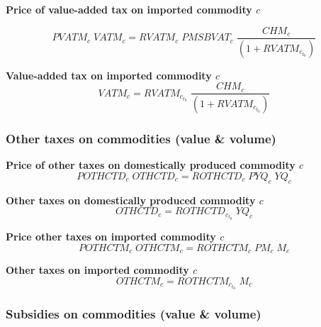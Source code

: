 \documentclass[12pt]{article}
\numberwithin{equation}{section}
\begin{document}
\noindent \textbf{Price of value-added tax on imported commodity $c$} 

\begin{dmath}
PVATM_{c} \; VATM_{c} = RVATM_{c} \; PMSBVAT_{c} \; \frac{CHM_{c}}{\left( 1 + RVATM_{c}_{t_0} \right)}
\label{Exception_taxes_prices.mdlPVATM[c]}
\end{dmath}

\noindent \textbf{Value-added tax on imported commodity $c$} 
\begin{dmath}
VATM_{c} = RVATM_{c}_{t_0} \; \frac{CHM_{c}}{\left( 1 + RVATM_{c}_{t_0} \right)}
\label{Exception_taxes_prices.mdlVATM[c]}
\end{dmath}



\subsubsection{Other taxes on commodities (value \& volume)}



\noindent \textbf{Price of other taxes on domestically produced commodity $c$} 
\begin{dmath}
POTHCTD_{c} \; OTHCTD_{c} = ROTHCTD_{c} \; PYQ_{c} \; YQ_{c}
\label{Exception_taxes_prices.mdlPOTHCTD[c]}
\end{dmath}

\noindent \textbf{Other taxes on domestically produced commodity $c$} 
\begin{dmath}
OTHCTD_{c} = ROTHCTD_{c}_{t_0} \; YQ_{c}
\label{Exception_taxes_prices.mdlOTHCTD[c]}
\end{dmath}

\noindent \textbf{Price other taxes on imported commodity $c$} 
\begin{dmath}
POTHCTM_{c} \; OTHCTM_{c} = ROTHCTM_{c} \; PM_{c} \; M_{c}
\label{Exception_taxes_prices.mdlPOTHCTM[c]}
\end{dmath}

\noindent \textbf{Other taxes on imported commodity $c$} 
\begin{dmath}
OTHCTM_{c} = ROTHCTM_{c}_{t_0} \; M_{c}
\label{Exception_taxes_prices.mdlOTHCTM[c]}
\end{dmath}



\subsubsection{Subsidies on commodities (value \& volume)}
\end{document}
